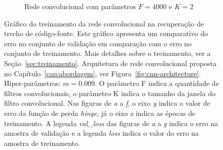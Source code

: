 \begin{figure}[H]
\begin{subfigure}{.5\textwidth}
  \caption{Rede convolucional com parâmetros $F = 4000$ e $K = 2$}
  \label{fig:cnn-4000-k-2-v2}
\end{subfigure}
\caption{Gráfico do treinamento da rede convolucional na recuperação de trecho de código-fonte. Este gráfico apresenta um comparativo do erro no conjunto de validação em comparação com o erro no conjunto de treinamento. Mais detalhes sobre o treinamento, ver a Seção~\ref{sec:treinamento}. Arquitetura de rede convolucional proposta no Capítulo~\ref{cap:abordagem}, ver Figura~\ref{fig:cnn-architecture}. Hiper-parâmetros: $m = 0.009$. O parâmetro F indica a quantidade de filtros convolucionais, o parâmetro K indica o tamanho da janela do filtro convolucional. Nas figuras de \emph{a} a \emph{f}, o eixo \emph{y} indica o valor de erro da função de perda \textit{hinge}, já o eixo \emph{x} indica as épocas de treinamento. A legenda \emph{val\_loss} das figuras de \emph{a} a \emph{g} indica o erro na amostra de validação e a legenda \emph{loss} indica o valor do erro na amostra de treinamento. }
\label{fig:treinamento-cnn-diferentes-kernels}
\end{figure}

